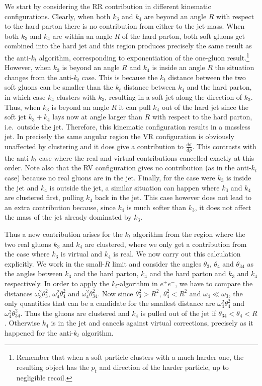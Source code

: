 We start by considering the RR contribution in different kinematic
configurations.  Clearly, when both $k_3$ and $k_4$ are beyond an angle
$R$ with respect to the hard parton there is no contribution from
either to the jet-mass.
%
When both $k_3$ and $k_4$ are within an angle $R$ of the hard parton,
both soft gluons get combined into the hard jet and this region
produces precisely the same result as the anti-$k_t$ algorithm,
corresponding to exponentiation of the one-gluon
result.\footnote{Remember that when a soft particle clusters with a
  much harder one, the resulting object has the $p_t$ and direction of
  the harder particle, up to negligible recoil.}
%
However, when $k_3$ is beyond an angle $R$ and $k_4$ is inside an angle $R$ the situation changes from the anti-$k_t$ case. 
%
This is because the $k_t$ distance between the two soft gluons can be
smaller than the $k_t$ distance between $k_4$ and the hard parton,
in which case $k_4$ clusters with $k_3$, resulting in a soft jet along
the direction of $k_3$.
%
%
Thus, when $k_3$ is beyond an angle $R$ it can pull $k_4$ out of the hard jet since the soft jet $k_3+k_4$ lays now at angle larger than $R$ with respect to the hard parton, i.e.\ outside the jet. 
%
Therefore, this kinematic configuration results in a massless jet.
%
% 
In precisely the same angular region the VR configuration is obviously
unaffected by clustering and it does give a contribution to
$\tfrac{d\sigma}{d\rho}$. This contrasts with the anti-$k_t$ case
where the real and virtual contributions cancelled exactly at this
order.
%
Note also that the RV configuration gives no contribution (as in the
anti-$k_t$ case) because no real gluons are in the jet.
%
Finally, for the case were $k_3$ is inside the jet and $k_4$ is
outside the jet, a similar situation can happen where $k_3$ and $k_4$
are clustered first, pulling $k_4$ back in the jet. This case however
does not lead to an extra contribution because, since $k_4$ is much
softer than $k_3$, it does not affect the mass of the jet already
dominated by $k_3$.

Thus a new  contribution arises for the $k_t$ algorithm from the region where the two real
gluons $k_3$ and $k_4$ are clustered, where we only get a contribution
from the case where $k_3$ is virtual and $k_4$ is real.
%
We now carry out this calculation explicitly. 
%
% 
We work in the small-$R$ limit and consider the angles $\theta_3$,
$\theta_4$ and $\theta_{34}$ as the angles between $k_3$ and the hard
parton, $k_4$ and the hard parton and $k_3$ and $k_4$ respectively. 
%
In order to apply the $k_t$-algorithm in $e^+ e^-$, we have to compare
the distances $\omega_3^2 \theta_3^2$, $\omega_4^2 \theta_4^2$ and
$\omega_4^2 \theta_{34}^2$.
%
Now since $\theta_3^2 > R^2$, $\theta_4^2 <R^2$ and
$\omega_4\ll\omega_3$, the only quantities that can be a candidate for
the smallest distance are $\omega_4^2 \theta_4^2$ and $\omega_4^2 \theta_{34}^2$. Thus
the gluons are clustered and $k_4$ is pulled out of the jet if
$\theta_{34}<\theta_4<R$.
%
Otherwise $k_4$ is in the jet and cancels against virtual corrections, precisely as it happened for the anti-$k_t$ algorithm.

